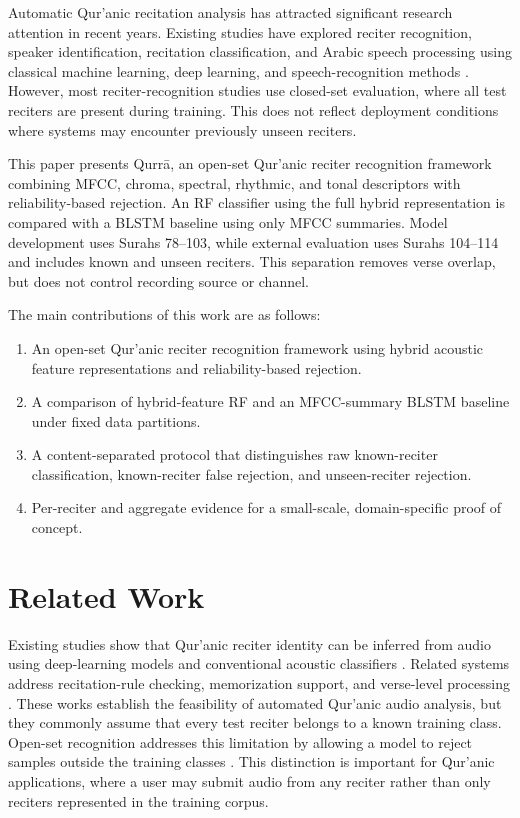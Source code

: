 \documentclass[a4paper,conference]{IEEEtran}
\begin{document}
Automatic Qur'anic recitation analysis has attracted significant research attention in recent years. Existing studies have explored reciter recognition, speaker identification, recitation classification, and Arabic speech processing using classical machine learning, deep learning, and speech-recognition methods \cite{ref1, ref3, ref4, ref5, ref6, ref7, ref8, ref11, ref12}. However, most reciter-recognition studies use closed-set evaluation, where all test reciters are present during training. This does not reflect deployment conditions where systems may encounter previously unseen reciters.

This paper presents Qurr\={a}, an open-set Qur'anic reciter recognition framework combining MFCC, chroma, spectral, rhythmic, and tonal descriptors with reliability-based rejection. An RF classifier \cite{breiman} using the full hybrid representation is compared with a BLSTM baseline \cite{schuster} using only MFCC summaries. Model development uses Surahs 78--103, while external evaluation uses Surahs 104--114 and includes known and unseen reciters. This separation removes verse overlap, but does not control recording source or channel.

The main contributions of this work are as follows:

\begin{enumerate}
\item An open-set Qur'anic reciter recognition framework using hybrid acoustic feature representations and reliability-based rejection.
\item A comparison of hybrid-feature RF and an MFCC-summary BLSTM baseline under fixed data partitions.
\item A content-separated protocol that distinguishes raw known-reciter classification, known-reciter false rejection, and unseen-reciter rejection.
\item Per-reciter and aggregate evidence for a small-scale, domain-specific proof of concept.
\end{enumerate}

\section{Related Work}

Existing studies show that Qur'anic reciter identity can be inferred from audio using deep-learning models \cite{ref1,ref6,ref7} and conventional acoustic classifiers \cite{ref3,ref4}. Related systems address recitation-rule checking, memorization support, and verse-level processing \cite{ref2,ref9,ref10}. These works establish the feasibility of automated Qur'anic audio analysis, but they commonly assume that every test reciter belongs to a known training class. Open-set recognition addresses this limitation by allowing a model to reject samples outside the training classes \cite{openset}. This distinction is important for Qur'anic applications, where a user may submit audio from any reciter rather than only reciters represented in the training corpus.
\end{document}
